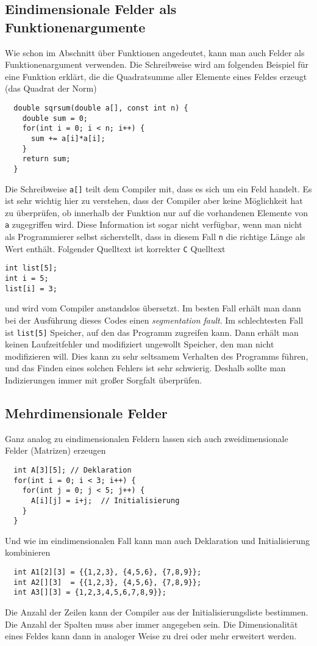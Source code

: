 \subsection{Eindimensionale Felder als Funktionenargumente}

Wie schon im Abschnitt über Funktionen angedeutet, kann man auch Felder als Funktionenargument verwenden.
Die Schreibweise wird am folgenden Beispiel für eine Funktion erklärt, die die Quadratsumme aller Elemente eines Feldes erzeugt (das Quadrat der Norm)
\begin{lstlisting}
  double sqrsum(double a[], const int n) {
    double sum = 0;
    for(int i = 0; i < n; i++) {
      sum += a[i]*a[i];
    }
    return sum;
  }
\end{lstlisting}
Die Schreibweise \texttt{a[]} teilt dem Compiler mit, dass es sich um ein Feld handelt.
Es ist sehr wichtig hier zu verstehen, dass der Compiler aber keine Möglichkeit hat zu überprüfen, ob innerhalb der Funktion nur auf die vorhandenen Elemente von \texttt{a} zugegriffen wird.
Diese Information ist sogar nicht verfügbar, wenn man nicht als Programmierer selbst sicherstellt, dass in diesem Fall \texttt{n} die richtige Länge als Wert enthält.
Folgender Quelltext ist korrekter \texttt{C} Quelltext
\begin{lstlisting}
int list[5];
int i = 5;
list[i] = 3;
\end{lstlisting}
und wird vom Compiler anstandslos übersetzt.
Im besten Fall erhält man dann bei der Ausführung dieses Codes einen \emph{segmentation fault}.
Im schlechtesten Fall ist \verb|list[5]| Speicher, auf den das Programm zugreifen kann.
Dann erhält man keinen Laufzeitfehler und modifiziert ungewollt Speicher, den man nicht modifizieren will.
Dies kann zu sehr seltsamem Verhalten des Programms führen, und das Finden eines solchen Fehlers ist sehr schwierig.
Deshalb sollte man Indizierungen immer mit großer Sorgfalt überprüfen.

\subsection{Mehrdimensionale Felder}

Ganz analog zu eindimensionalen Feldern lassen sich auch zweidimensionale Felder (Matrizen) erzeugen
\begin{lstlisting}
  int A[3][5]; // Deklaration
  for(int i = 0; i < 3; i++) {
    for(int j = 0; j < 5; j++) {
      A[i][j] = i+j;  // Initialisierung
    }
  }
\end{lstlisting}
Und wie im eindimensionalen Fall kann man auch Deklaration und Initialisierung kombinieren
\begin{lstlisting}
  int A1[2][3] = {{1,2,3}, {4,5,6}, {7,8,9}};
  int A2[][3]  = {{1,2,3}, {4,5,6}, {7,8,9}};
  int A3[][3] = {1,2,3,4,5,6,7,8,9}};
\end{lstlisting}
Die Anzahl der Zeilen kann der Compiler aus der Initialisierungsliste bestimmen.
Die Anzahl der Spalten muss aber immer angegeben sein.
Die Dimensionalität eines Feldes kann dann in analoger Weise zu drei oder mehr erweitert werden.

